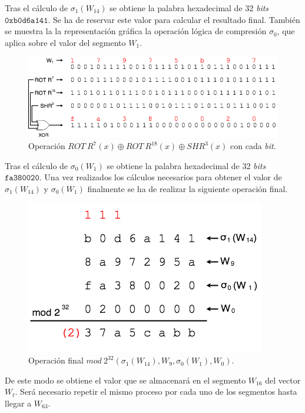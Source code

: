 \documentclass{article}
\begin{document}
        Tras el cálculo de $\sigma_{1}(W_{14})$ se obtiene la palabra hexadecimal de 32 \textit{bits} $\texttt{0xb0d6a141}$. Se ha de reservar este valor para calcular el resultado final. También se muestra la la representación gráfica la operación lógica de compresión $\sigma_{0}$, que aplica sobre el valor del segmento $W_{1}$.
        
        \begin{figure}[H]
        \centering
            \includegraphics[scale=0.445]{img/SHA-256-Wt_operacion_sigma0.png}
            \caption{Operación $ROT \ R^{7}(x) \oplus ROT \ R^{18}(x) \oplus SHR^{3}(x)$ con cada \textit{bit}.}
        \end{figure}
        
        Tras el cálculo de $\sigma_{0}(W_{1})$ se obtiene la palabra hexadecimal de 32 \textit{bits} $\texttt{fa380020}$. Una vez realizados los cálculos necesarios para obtener el valor de $\sigma_{1}(W_{14})$ y $\sigma_{0}(W_{1})$ finalmente se ha de realizar la siguiente operación final.
        
        \begin{figure}[H]
        \centering
            \includegraphics[scale=0.445]{img/SHA-256-Wt_operacion_mod2_32_final.png}
            \caption{Operación final $mod \ 2^{32} (\sigma_{1}(W_{14}), W_{9}, \sigma_{0}(W_{1}), W_{0})$.}
        \end{figure}
        
        De este modo se obtiene el valor que se almacenará en el segmento $W_{16}$ del vector $W_t$. Será necesario repetir el mismo proceso por cada uno de los segmentos hasta llegar a $W_{63}$.
        
\end{document}
